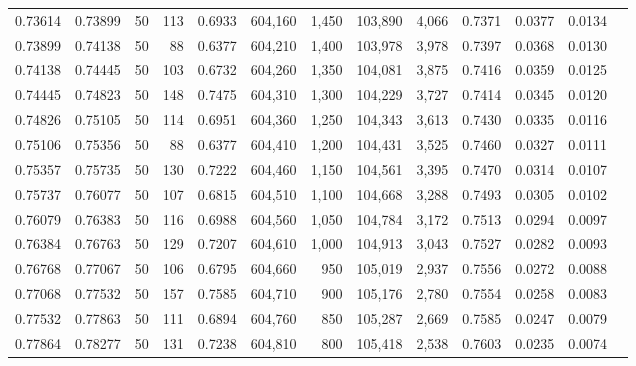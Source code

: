 \begin{tabular}{rrrrrrrrrrrrr}
0.73614 & 0.73899 &    50 & 113 &                                     0.6933 & 604,160 &   1,450 & 103,890 &   4,066 & 0.7371 & 0.0377 & 0.0134 \\
0.73899 & 0.74138 &    50 &  88 &                                     0.6377 & 604,210 &   1,400 & 103,978 &   3,978 & 0.7397 & 0.0368 & 0.0130 \\
0.74138 & 0.74445 &    50 & 103 &                                     0.6732 & 604,260 &   1,350 & 104,081 &   3,875 & 0.7416 & 0.0359 & 0.0125 \\
0.74445 & 0.74823 &    50 & 148 &                                     0.7475 & 604,310 &   1,300 & 104,229 &   3,727 & 0.7414 & 0.0345 & 0.0120 \\
0.74826 & 0.75105 &    50 & 114 &                                     0.6951 & 604,360 &   1,250 & 104,343 &   3,613 & 0.7430 & 0.0335 & 0.0116 \\
0.75106 & 0.75356 &    50 &  88 &                                     0.6377 & 604,410 &   1,200 & 104,431 &   3,525 & 0.7460 & 0.0327 & 0.0111 \\
0.75357 & 0.75735 &    50 & 130 &                                     0.7222 & 604,460 &   1,150 & 104,561 &   3,395 & 0.7470 & 0.0314 & 0.0107 \\
0.75737 & 0.76077 &    50 & 107 &                                     0.6815 & 604,510 &   1,100 & 104,668 &   3,288 & 0.7493 & 0.0305 & 0.0102 \\
0.76079 & 0.76383 &    50 & 116 &                                     0.6988 & 604,560 &   1,050 & 104,784 &   3,172 & 0.7513 & 0.0294 & 0.0097 \\
0.76384 & 0.76763 &    50 & 129 &                                     0.7207 & 604,610 &   1,000 & 104,913 &   3,043 & 0.7527 & 0.0282 & 0.0093 \\
0.76768 & 0.77067 &    50 & 106 &                                     0.6795 & 604,660 &     950 & 105,019 &   2,937 & 0.7556 & 0.0272 & 0.0088 \\
0.77068 & 0.77532 &    50 & 157 &                                     0.7585 & 604,710 &     900 & 105,176 &   2,780 & 0.7554 & 0.0258 & 0.0083 \\
0.77532 & 0.77863 &    50 & 111 &                                     0.6894 & 604,760 &     850 & 105,287 &   2,669 & 0.7585 & 0.0247 & 0.0079 \\
0.77864 & 0.78277 &    50 & 131 &                                     0.7238 & 604,810 &     800 & 105,418 &   2,538 & 0.7603 & 0.0235 & 0.0074 \\

\end{tabular}

